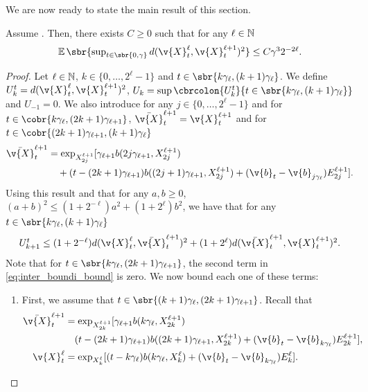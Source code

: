 We are now ready to state the main result of this section.

\begin{proposition}
	\label{prop:bound_square}
	Assume .
	Then, there exists $C \geq 0$ such that for any $\ell \in \mathbb{N}$ \begin{equation} \textstyle{ \E\sbr{\sup_{t \in \sbr{0, \gamma}} d(\v{X}_t^\ell, \v{X}_t^{\ell+1})^2} \leq C \gamma^3 2^{-2\ell} .
		}
	\end{equation}
\end{proposition}

\begin{proof}{}{}
	Let $\ell \in \mathbb{N}$, $k \in \{0, \dots, 2^{\ell} - 1\}$ and $t \in \sbr{k \gamma_\ell, (k+1) \gamma_\ell}$.
	We define $U_k^t = d(\v{X}_t^\ell, \v{X}_{t}^{\ell+1})^2$, $U_k = \sup \cbrcolon{U_k^t}{t \in \sbr{k \gamma_\ell, (k+1) \gamma_\ell}}$ and $U_{-1}=0$.
	We also introduce for any $j \in \{0, \dots, 2^{\ell} - 1\}$ and for $t \in \cobr{k \gamma_\ell, (2k+1) \gamma_{\ell+1}}$, $\bar{\v{X}}_t^{\ell+1} = \v{X}_t^{\ell+1}$ and for $t \in \cobr{(2k+1) \gamma_{\ell+1}, (k+1) \gamma_{\ell}}$ \begin{align} \bar{\v{X}}_{t}^{\ell+1} & = \exp_{X_{2j}^{\ell+1}}[\gamma_{\ell+1} b(2 j \gamma_{\ell + 1}, X_{2j}^{\ell+1}) \\ & \quad + (t - (2k+1)\gamma_{\ell+1}) b((2j+1) \gamma_{\ell + 1}, X_{2j}^{\ell+1}) + (\v{b}_{t} - \v{b}_{j \gamma_\ell}) E_{2j}^{\ell+1} ] .
	\end{align}
	Using this result and that for any $a,b \geq0$, $(a+b)^2 \leq (1+2^{-\ell}) a^2 + (1 +2^\ell)b^2$, we have that for any $t \in \sbr{k \gamma_\ell, (k+1) \gamma_\ell}$ \begin{equation} \label{eq:inter_boundi_bound} \textstyle{ U_{k+1}^t \leq (1 + 2^{-\ell}) d(\v{X}_{t}^\ell, \bar{\v{X}}_{t}^{\ell+1})^2 + (1 + 2^{\ell}) d(\bar{\v{X}}_{t}^{\ell+1}, \v{X}_{t}^{\ell+1})^2 .
		}
	\end{equation}
	Note that for $t \in \sbr{k\gamma_\ell, (2k+1) \gamma_{\ell+1}}$, the second term in \eqref{eq:inter_boundi_bound} is zero.
	We now bound each one of these terms: \begin{enumerate}[wide, labelindent=0pt, label=(\alph*)] \item First, we assume that $t \in \sbr{(k+1) \gamma_{\ell}, (2k+1) \gamma_{\ell+1}}$.
		      Recall that \begin{align} \bar{\v{X}}_{t}^{\ell+1} & = \exp_{X_{2k}^{\ell+1}}[\gamma_{\ell+1}b(k \gamma_{\ell }, X_{2k}^{\ell+1}) \\ & \quad (t - (2k+1)\gamma_{\ell+1}) b((2 k+1) \gamma_{\ell + 1}, X_{2k}^{\ell+1}) + (\v{b}_{t} - \v{b}_{k \gamma_\ell}) E_{2k}^{\ell+1} ] , \\ \v{X}_{t}^\ell &= \exp_{X_k^\ell}[( t - k\gamma_\ell) b(k \gamma_\ell, X_k^\ell) + (\v{b}_{t} - \v{b}_{k \gamma_\ell}) E_{k}^{\ell} ] .

\end{align}
\end{enumerate}
\end{proof}

